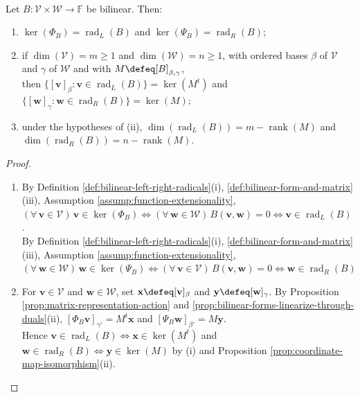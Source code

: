 \begin{proposition} \label{prop:bilinear-radicals-matrix-and-dual-maps} \\
Let $B:\mathcal{V}\times\mathcal{W}\to\mathbb{F}$ be bilinear. Then:
\begin{enumerate}[label=(\roman*)]
\setlength{\itemsep}{0pt}
\item $\ker(\Phi_B)=\operatorname{rad}_{L}(B)$ and $\ker(\Psi_B)=\operatorname{rad}_{R}(B)$;
\item if $\dim(\mathcal{V})=m\geq1$ and $\dim(\mathcal{W})=n\geq1$, with ordered bases $\beta$ of $\mathcal{V}$ and $\gamma$ of $\mathcal{W}$ and with $M\defeq[B]_{\beta,\gamma}$,\\
then $\{[\mathbf{v}]_{\beta}:\mathbf{v}\in\operatorname{rad}_{L}(B)\}=\ker(M^t)$ and $\{[\mathbf{w}]_{\gamma}:\mathbf{w}\in\operatorname{rad}_{R}(B)\}=\ker(M)$;
\item under the hypotheses of (ii), $\dim(\operatorname{rad}_{L}(B))=m-\operatorname{rank}(M)$ and $\dim(\operatorname{rad}_{R}(B))=n-\operatorname{rank}(M)$.
\end{enumerate}
\begin{proof}
\begin{enumerate}[label=(\roman*)]
\setlength{\itemsep}{0pt}
\item By Definition \ref{def:bilinear-left-right-radicals}(i), \ref{def:bilinear-form-and-matrix}(iii), Assumption \ref{assump:function-extensionality}, $(\forall\,\mathbf{v}\in\mathcal{V})\,\mathbf{v}\in\ker(\Phi_B)\Longleftrightarrow(\forall\,\mathbf{w}\in\mathcal{W})\,B(\mathbf{v},\mathbf{w})=0\Longleftrightarrow\mathbf{v}\in\operatorname{rad}_{L}(B)$.\\
By Definition \ref{def:bilinear-left-right-radicals}(i), \ref{def:bilinear-form-and-matrix}(iii),  Assumption \ref{assump:function-extensionality}, $(\forall\,\mathbf{w}\in\mathcal{W})\,\mathbf{w}\in\ker(\Psi_B)\Longleftrightarrow(\forall\,\mathbf{v}\in\mathcal{V})\,B(\mathbf{v},\mathbf{w})=0\Longleftrightarrow\mathbf{w}\in\operatorname{rad}_{R}(B)$ 
\item For $\mathbf{v}\in\mathcal{V}$ and $\mathbf{w}\in\mathcal{W}$, set $\mathbf{x}\defeq[\mathbf{v}]_{\beta}$ and $\mathbf{y}\defeq[\mathbf{w}]_{\gamma}$. By Proposition \ref{prop:matrix-representation-action} and \ref{prop:bilinear-forms-linearize-through-duals}(ii), $[\Phi_B\mathbf{v}]_{\gamma'}=M^t\mathbf{x}$ and $[\Psi_B\mathbf{w}]_{\beta'}=M\mathbf{y}$.\\
Hence $\mathbf{v}\in\operatorname{rad}_{L}(B)\Longleftrightarrow\mathbf{x}\in\ker(M^t)$ and $\mathbf{w}\in\operatorname{rad}_{R}(B)\Longleftrightarrow\mathbf{y}\in\ker(M)$ by (i) and Proposition \ref{prop:coordinate-map-isomorphism}(ii).\\

\end{enumerate}
\end{proof}
\end{proposition}
